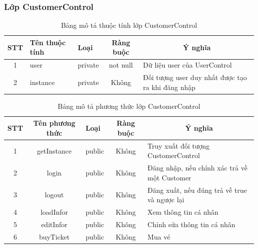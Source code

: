 \documentclass[a4paper, 12pt]{article}
\begin{document}
\subsubsection{Lớp CustomerControl}

\begin{table}[H]
	\begin{center}
		\begin{tabular}{|c|l|l|c|l|}
		\hline
		STT & Tên thuộc tính & Loại    & Ràng buộc & \multicolumn{1}{c|}{Ý nghĩa}                                           \\ \hline
		1   & user           & private &    not null       & Dữ liệu user của UserControl                      \\ \hline
		2   & instance       & private &         Không  & Đối tượng user duy nhất được tạo ra khi đăng nhập \\ \hline
		\end{tabular}
		\caption{Bảng mô tả thuộc tính lớp CustomerControl}
	\end{center}
\end{table}

\begin{table}[H]
	\begin{center}
		\begin{tabular}{|c|c|l|c|l|}
		\hline
		STT & Tên phương thức & Loại   & Ràng buộc & \multicolumn{1}{c|}{Ý nghĩa}                                      \\ \hline
		1   & getInstance     & public &   Không        & Truy xuất đối tượng CustomerControl          \\ \hline
		2   & login           & public &   Không        & Đăng nhập, nếu chính xác trả về một Customer \\ \hline
		3   & logout          & public &   Không        & Đăng xuất, nếu đúng trả về true và ngược lại \\ \hline
		4   & loadInfor       & public &   Không        & Xem thông tin cá nhân                        \\ \hline
		5   & editInfor       & public &   Không        & Chỉnh sửa thông tin cá nhân                  \\ \hline
		6   & buyTicket       & public &   Không        & Mua vé                                       \\ \hline
		\end{tabular}
		\caption{Bảng mô tả phương thức lớp CustomerControl}
	\end{center}
\end{table}
\end{document}
